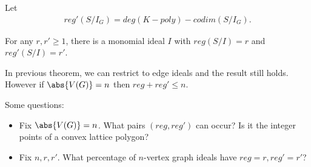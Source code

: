 \begin{definition}
    Let
    \begin{align*}
        reg'(S / I_G) = deg (K-poly) - codim (S/ I_G).
    \end{align*}
\end{definition}

\begin{theorem}
    For any $r,r' \geq 1$, there is a monomial ideal $I$ with $reg (S/I) = r$ and $reg' (S/I) = r'$.
\end{theorem}

\begin{theorem}
    In previous theorem, we can restrict to edge ideals and the result still holds. However if $\abs{V(G)} = n$ then $reg + reg' \leq n$.
\end{theorem}

\begin{remark}
    Some questions:
    \begin{itemize}
        \item Fix $\abs{V(G) } = n$. What pairs $(reg, reg')$ can occur? Is it the integer points of a convex lattice polygon?
        \item Fix $n,r,r'$. What percentage of $n$-vertex graph ideals have $reg = r, reg' = r'$?
    \end{itemize}
\end{remark}